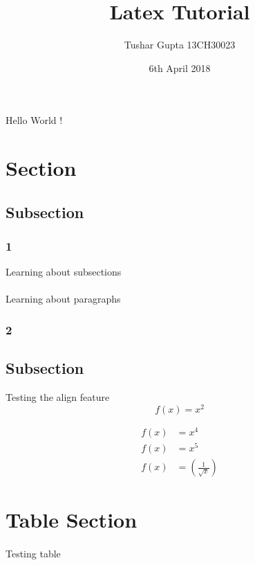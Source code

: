 \documentclass[a4paper,11pt]{article}
\title{Latex Tutorial}
\author{Tushar Gupta 13CH30023}
\date{6th April 2018}
\begin{document}
\maketitle
\newpage

\newpage
Hello World !

\section{Section}

\subsection{Subsection}
    \subsubsection{1}
    Learning about subsections 
    \paragraph{}
    Learning about paragraphs
    
    \subsubsection{2}

\subsection{Subsection}
 Testing the align feature
\begin{equation*}
    f(x) = x^2      
\end{equation*}

\begin{align*}
    f(x) &= x^4\\
    f(x) &= x^5\\
    f(x)&= \left(\frac{1}{\sqrt{x}}\right)
\end{align*}
\newpage
\section{Table Section}
\paragraph{}
Testing table
\begin{table}
\end{table}
\end{document}
